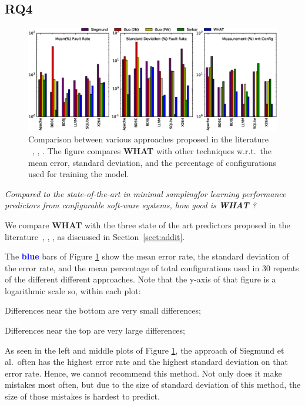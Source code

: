 \documentclass{sig-alternative}
\newcommand{\what}{{\bf WHAT }}
\begin{document}
 
\subsection{RQ4}

\begin{figure}[htbp]
\includegraphics[width=\linewidth]{Figures/compare_graph_h.eps}
\caption{Comparison between various approaches proposed in the literature ~\cite{siegmund2012predicting}, \cite{guo2013variability}, \cite{sarkar2015cost}. The figure compares \what with other techniques w.r.t.\ the mean error, standard deviation, and the percentage of configurations used for training the model.}\label{fig:Comparison}
\end{figure}
 
 \begin{center}
{\em Compared to the state-of-the-art in minimal samplingfor learning performance predictors from configurable soft-ware systems, how good is \what?}
\end{center}

We compare \what with the three state of the art predictors proposed in the literature~\cite{siegmund2012predicting}, \cite{guo2013variability}, \cite{sarkar2015cost}, as discussed in Section~\ref{sect:addit}.
 
 The \textcolor{blue}{\bf blue} bars of Figure \ref{fig:Comparison} show the
 mean error rate, the standard deviation of the error rate, and the mean percentage
 of total configurations used in 30 repeats of the different different approaches.
 Note that the y-axis of that figure is a logarithmic scale so, within each plot:
 \begin{compactitem}
 \item Differences near the bottom  are very small differences;
 \item Differences near the top   are very large differences;
 \end{compactitem}
 
As seen in the left and middle plots of
Figure 
\ref{fig:Comparison}, 
the approach of Siegmund et al.\ often has the highest
error rate and the highest
standard deviation on that error rate. Hence,
we cannot recommend this method. Not only
does it make mistakes most often, but due to
the size of standard deviation of this method, the  size of those
mistakes is hardest to predict. 
\end{document}
